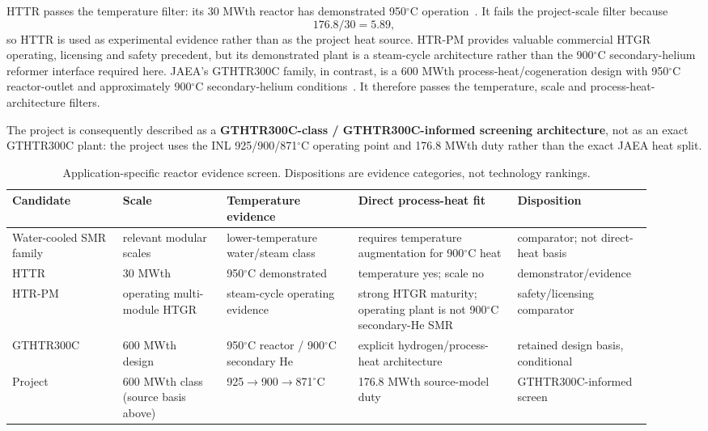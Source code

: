 HTTR passes the temperature filter: its 30 MWth reactor has demonstrated 950$^\circ$C operation~\cite{jaeahttr2026ops}.  It fails the project-scale filter because
\[
176.8/30=5.89,
\]
so HTTR is used as experimental evidence rather than as the project heat source.  HTR-PM provides valuable commercial HTGR operating, licensing and safety precedent, but its demonstrated plant is a steam-cycle architecture rather than the 900$^\circ$C secondary-helium reformer interface required here.  JAEA's GTHTR300C family, in contrast, is a 600 MWth process-heat/cogeneration design with 950$^\circ$C reactor-outlet and approximately 900$^\circ$C secondary-helium conditions~\cite{nishihara2007potential}.  It therefore passes the temperature, scale and process-heat-architecture filters.

The project is consequently described as a \textbf{GTHTR300C-class / GTHTR300C-informed screening architecture}, not as an exact GTHTR300C plant: the project uses the INL 925/900/871$^\circ$C operating point and 176.8 MWth duty rather than the exact JAEA heat split.

\begin{table}[htbp]\centering\scriptsize
\caption{Application-specific reactor evidence screen.  Dispositions are evidence categories, not technology rankings.}
\label{tab:reactor-screen}
\begin{tabular}{p{0.16\linewidth}p{0.15\linewidth}p{0.19\linewidth}p{0.23\linewidth}p{0.19\linewidth}}
\toprule
Candidate & Scale & Temperature evidence & Direct process-heat fit & Disposition\\ \midrule
Water-cooled SMR family & relevant modular scales & lower-temperature water/steam class & requires temperature augmentation for 900$^\circ$C heat & comparator; not direct-heat basis\\
HTTR & 30 MWth~\cite{jaeahttr2026ops} & 950$^\circ$C demonstrated~\cite{jaeahttr2026ops} & temperature yes; scale no & demonstrator/evidence\\
HTR-PM & operating multi-module HTGR & steam-cycle operating evidence & strong HTGR maturity; operating plant is not 900$^\circ$C secondary-He SMR & safety/licensing comparator\\
GTHTR300C & 600 MWth design~\cite{nishihara2007potential} & 950$^\circ$C reactor / 900$^\circ$C secondary He~\cite{nishihara2007potential} & explicit hydrogen/process-heat architecture~\cite{nishihara2007potential} & retained design basis, conditional\\
Project & 600 MWth class (source basis above) & 925$\rightarrow$900$\rightarrow$871$^\circ$C~\cite{inltev953,inltev961} & 176.8 MWth source-model duty~\cite{inltev961} & GTHTR300C-informed screen\\
\bottomrule
\end{tabular}
\end{table}

